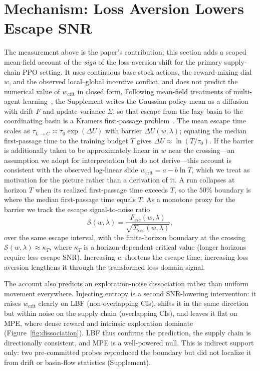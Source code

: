 \documentclass[letterpaper]{article} %
\theoremstyle{plain}
\newcommand{\wcrit}{w_{\mathrm{crit}}}
\begin{document}
\section{Mechanism: Loss Aversion Lowers Escape SNR}
\label{sec:mechanism}

The measurement above is the paper's contribution; this section adds a scoped mean-field account
of the \emph{sign} of the loss-aversion shift for the primary supply-chain PPO setting. It uses
continuous base-stock actions, the reward-mixing dial $w$, and the observed local--global incentive
conflict, and does not predict the numerical value of $\wcrit$ in closed form. Following mean-field
treatments of multi-agent
learning~\citep{barfuss2019deterministic,hu2019meanfield,hussain2025convergence}, the Supplement
writes the Gaussian policy mean as a diffusion with drift $F$ and update-variance $\Sigma$, so that
escape from the lazy basin to the coordinating basin is a Kramers first-passage
problem~\citep{kramers1940brownian}. The mean escape time scales as
$\tau_{L\to C}\asymp\tau_0\exp(\Delta U)$ with barrier $\Delta U(w,\lambda)$; equating the median
first-passage time to the training budget $T$ gives $\Delta U\approx\ln(T/\tau_0)$. If the barrier
is additionally taken to be approximately linear in $w$ near the crossing---an assumption we adopt
for interpretation but do not derive---this account is consistent with the observed log-linear slide
$\wcrit=a-b\ln T$, which we treat as motivation for the picture rather than a derivation of it. A
run collapses at horizon $T$ when its realized first-passage time exceeds $T$,
so the $50\%$ boundary is where the median first-passage time equals $T$. As a monotone proxy for
the barrier we track the escape signal-to-noise ratio
\begin{equation}
 \mathcal{S}(w,\lambda)=
 \frac{F_{\mathrm{esc}}(w,\lambda)}
 {\sqrt{\Sigma_{\mathrm{esc}}(w,\lambda)}} ,
 \label{eq:snr}
\end{equation}
over the same escape interval, with the finite-horizon boundary at the crossing
$\mathcal{S}(w,\lambda)\approx\kappa_T$, where $\kappa_T$ is a horizon-dependent critical value
(longer horizons require less escape SNR). Increasing $w$ shortens the escape time; increasing loss
aversion lengthens it through the transformed loss-domain signal.

The account also predicts an exploration-noise dissociation rather than uniform movement
everywhere. Injecting entropy is a second SNR-lowering intervention: it raises $\wcrit$ clearly on
LBF (non-overlapping CIs), shifts it in the same direction but within noise on the supply chain
(overlapping CIs), and leaves it flat on MPE, where dense reward and intrinsic exploration dominate
(Figure~\ref{fig:dissociation}). LBF thus confirms the prediction, the supply chain is directionally
consistent, and MPE is a well-powered null. This is indirect support only: two pre-committed probes
reproduced the boundary but did not localize it from drift or basin-flow statistics (Supplement).
\end{document}
